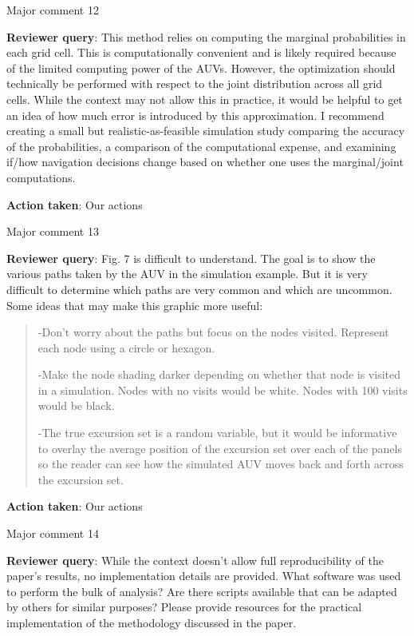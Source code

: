 \documentclass[a4paper]{article}
\def\reply{\textbf{Reviewer query}}
\def\action{\textbf{Action taken}}
\begin{document}
\begin{answers}
\item{Major comment 12}\label{q23}

\reply: This method relies on computing the marginal probabilities in each grid cell. This is computationally convenient and is likely required because of the limited computing power of the AUVs. However, the optimization should technically be performed with respect to the joint distribution across all grid cells. While the context may not allow this in practice, it would be helpful to get an idea of how much error is introduced by this approximation. I recommend creating a small but realistic-as-feasible simulation study comparing the accuracy of the probabilities, a comparison of the computational expense, and examining if/how navigation decisions change based on whether one uses the marginal/joint computations. 

\action: Our actions

\item{Major comment 13}\label{q24}

\reply: Fig. 7 is difficult to understand. The goal is to show the various paths taken by the AUV in the
simulation example. But it is very difficult to determine which paths are very common and which
are uncommon. Some ideas that may make this graphic more useful:

\begin{quote}
-Don’t worry about the paths but focus on the nodes visited. Represent each node using a circle or hexagon.\par
-Make the node shading darker depending on whether that node is visited in a
simulation. Nodes with no visits would be white. Nodes with 100 visits would be black.\par
-The true excursion set is a random variable, but it would be informative to overlay the
average position of the excursion set over each of the panels so the reader can see how
the simulated AUV moves back and forth across the excursion set.
\end{quote}

\action: Our actions

\item{Major comment 14}\label{q25}

\reply: While the context doesn’t allow full reproducibility of the paper’s results, no implementation details are provided. What software was used to perform the bulk of analysis? Are there scripts available that can be adapted by others for similar purposes? Please provide resources for the practical implementation of the methodology discussed in the paper.


\end{answers}
\end{document}
